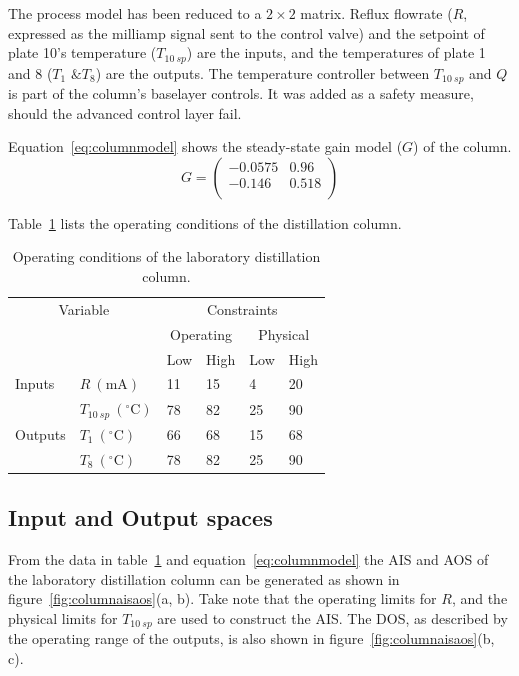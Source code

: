 \documentclass[final,authoryear,5pt,times,twocolumn]{elsarticle}
\newcommand{\degrees}[1]{^{\circ}\text{{#1}}} %
\newcommand{\bpm}{\begin{pmatrix}} %
\newcommand{\epm}{\end{pmatrix}}
\begin{document}
The process model has been reduced to a $2\times2$ matrix.
Reflux flowrate ($R$, expressed as the milliamp signal sent to the control valve) and the setpoint of plate 10's temperature ($T_{10~sp}$) are the inputs, and the temperatures of plate 1 and 8 ($T_1\text{ \& }T_{8}$) are the outputs.
The temperature controller between $T_{10~sp}$ and $Q$ is part of the column's baselayer controls.
It was added as a safety measure, should the advanced control layer fail.

Equation~\ref{eq:columnmodel} shows the steady-state gain model ($G$) of the column.
\begin{equation}
  \label{eq:columnmodel}
  G = \bpm -0.0575 & 0.96 \\       %
           -0.146  & 0.518 \\ \epm %
\end{equation}

Table~\ref{tab:columnopcon} lists the operating conditions of the distillation column.
\begin{table}[htbp]
  \centering
  \begin{tabular}{llllll}
    \toprule
    \multicolumn{2}{c}{Variable} & \multicolumn{4}{c}{Constraints}\\
     && \multicolumn{2}{c}{Operating} & \multicolumn{2}{c}{Physical} \\
    \cmidrule(r){3-4} \cmidrule(r){5-6}
    && Low & High & Low & High \\ 
    \midrule
    Inputs &$R~(\text{mA})$          & 11 & 15 & 4 & 20 \\
           &$T_{10~sp}~(\degrees{C})$ & 78 & 82 & 25 & 90 \\[1.3ex]
    Outputs &$T_1~(\degrees{C})$     & 66 & 68 & 15 & 68 \\
            &$T_{8}~(\degrees{C})$   & 78 & 82 & 25 & 90 \\
    \bottomrule
  \end{tabular}
  \caption{Operating conditions of the laboratory distillation column.}
  \label{tab:columnopcon}
\end{table}

\subsection{Input and Output spaces}
From the data in table~\ref{tab:columnopcon} and equation~\ref{eq:columnmodel} the AIS and AOS of the laboratory distillation column can be generated as shown in figure~\ref{fig:columnaisaos}(a, b).
Take note that the operating limits for $R$, and the physical limits for $T_{10~sp}$ are used to construct the AIS.
The DOS, as described by the operating range of the outputs, is also shown in figure~\ref{fig:columnaisaos}(b, c).
\end{document}
